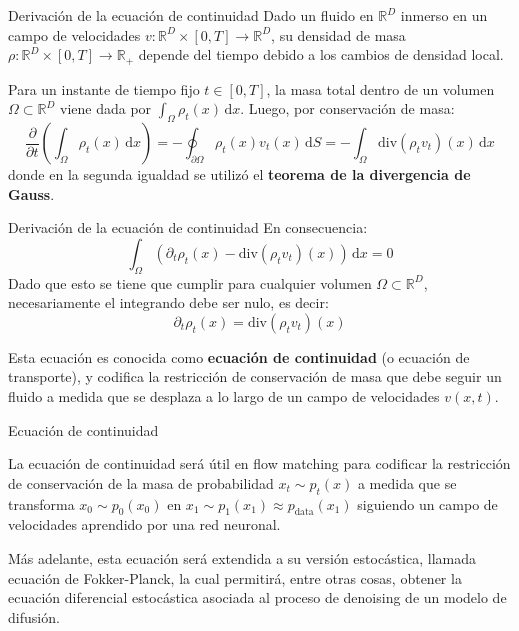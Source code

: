 \documentclass{beamer}
\newcommand{\R}{\mathbb{R}}
\begin{document}
\begin{frame}{Derivación de la ecuación de continuidad}
    Dado un fluido en $\R^D$ inmerso en un campo de velocidades $v:\R^D\times[0,T]\to\R^D$, su densidad de masa $\rho:\R^D\times[0,T]\to\R_+$ depende del tiempo debido a los cambios de densidad local.
    
    Para un instante de tiempo fijo $t\in[0,T]$, la masa total dentro de un volumen $\Omega\subset\R^D$ viene dada por $\int_\Omega \rho_t(x)\,\text{d}x$. Luego, por conservación de masa:
    \begin{equation*}
        \frac{\partial}{\partial t}\left(\int_\Omega \rho_t(x)\,\text{d}x\right)=-\oint_{\partial\Omega}\rho_t(x)v_t(x)\,\text{d}S = -\int_\Omega \text{div}(\rho_t v_t)(x)\,\text{d}x
    \end{equation*}
    donde en la segunda igualdad se utilizó el \textbf{teorema de la divergencia de Gauss}.
\end{frame}

\begin{frame}{Derivación de la ecuación de continuidad}
    En consecuencia:
    \begin{equation*}
        \int_\Omega \left(\partial_t \rho_t(x)-\text{div}(\rho_t v_t)(x)\right)\,\text{d}x=0
    \end{equation*}
    Dado que esto se tiene que cumplir para cualquier volumen $\Omega\subset\R^D$, necesariamente el integrando debe ser nulo, es decir:
\begin{equation*}
\partial_t \rho_t(x)=\text{div}(\rho_t v_t)(x)
\end{equation*}

Esta ecuación es conocida como \textbf{ecuación de continuidad} (o ecuación de transporte), y codifica la restricción de conservación de masa que debe seguir un fluido a medida que se desplaza a lo largo de un campo de velocidades $v(x,t)$.

\end{frame}

\begin{frame}{Ecuación de continuidad}

    La ecuación de continuidad será útil en flow matching para codificar la restricción de conservación de la masa de probabilidad $x_t\sim p_t(x)$ a medida que se transforma $x_0\sim p_0(x_0)$ en $x_1\sim p_1(x_1)\approx p_\text{data}(x_1)$ siguiendo un campo de velocidades aprendido por una red neuronal.

Más adelante, esta ecuación será extendida a su versión estocástica, llamada ecuación de Fokker-Planck, la cual permitirá, entre otras cosas, obtener la ecuación diferencial estocástica asociada al proceso de denoising de un modelo de difusión.

\end{frame}
\end{document}
